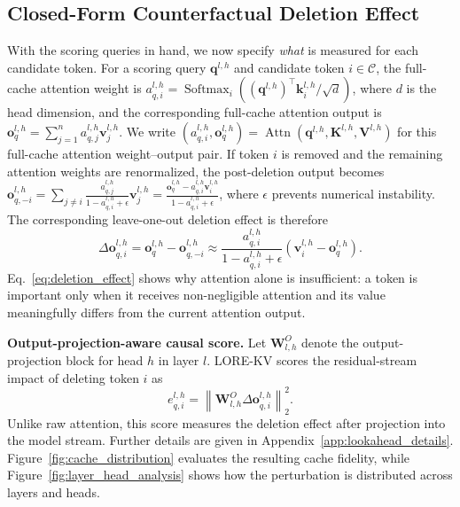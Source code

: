\documentclass{article} %
\begin{document}
\subsection{Closed-Form Counterfactual Deletion Effect} \label{subsec:deletion}
With the scoring queries in hand, we now specify \emph{what} is measured for each candidate token. For a scoring query $\mathbf{q}^{l,h}$ and candidate token $i\in\mathcal{C}$, the full-cache attention weight is
$a^{l,h}_{q,i}=\operatorname{Softmax}_i\!\left((\mathbf{q}^{l,h})^\top\mathbf{k}^{l,h}_{i}/\sqrt{d}\right)$,
where $d$ is the head dimension, and the corresponding full-cache attention output is
$\mathbf{o}^{l,h}_{q}=\sum_{j=1}^{n}a^{l,h}_{q,j}\mathbf{v}^{l,h}_{j}$.
We write
$(a^{l,h}_{q,i},\mathbf{o}^{l,h}_{q})
=\operatorname{Attn}(\mathbf{q}^{l,h},\mathbf{K}^{l,h},\mathbf{V}^{l,h})$
for this full-cache attention weight--output pair. If token $i$ is removed and the remaining attention weights are renormalized, the post-deletion output becomes
$\mathbf{o}^{l,h}_{q,-i}
=\sum_{j\neq i}\frac{a^{l,h}_{q,j}}{1-a^{l,h}_{q,i}+\epsilon}\mathbf{v}^{l,h}_{j}
=\frac{\mathbf{o}^{l,h}_{q}-a^{l,h}_{q,i}\mathbf{v}^{l,h}_{i}}
{1-a^{l,h}_{q,i}+\epsilon}$,
where $\epsilon$ prevents numerical instability. The corresponding leave-one-out deletion effect is therefore
\begin{equation}
\Delta\mathbf{o}^{l,h}_{q,i}
=\mathbf{o}^{l,h}_{q}-\mathbf{o}^{l,h}_{q,-i}
\approx
\frac{a^{l,h}_{q,i}}{1-a^{l,h}_{q,i}+\epsilon}
\left(\mathbf{v}^{l,h}_{i}-\mathbf{o}^{l,h}_{q}\right).
\label{eq:deletion_effect}
\end{equation}
Eq.~\ref{eq:deletion_effect} shows why attention alone is insufficient: a token is important only when it receives non-negligible attention and its value meaningfully differs from the current attention output.

\textbf{Output-projection-aware causal score.}
Let $\mathbf{W}^{O}_{l,h}$ denote the output-projection block for head $h$ in layer $l$. LORE-KV scores the residual-stream impact of deleting token $i$ as
\begin{equation}
e^{l,h}_{q,i}
=
\left\|
\mathbf{W}^{O}_{l,h}\Delta\mathbf{o}^{l,h}_{q,i}
\right\|_2^2 .
\label{eq:projected_score}
\end{equation}
Unlike raw attention, this score measures the deletion effect after projection into the model stream. Further details are given in Appendix~\ref{app:lookahead_details}. Figure~\ref{fig:cache_distribution} evaluates the resulting cache fidelity, while Figure~\ref{fig:layer_head_analysis} shows how the perturbation is distributed across layers and heads.
\end{document}

